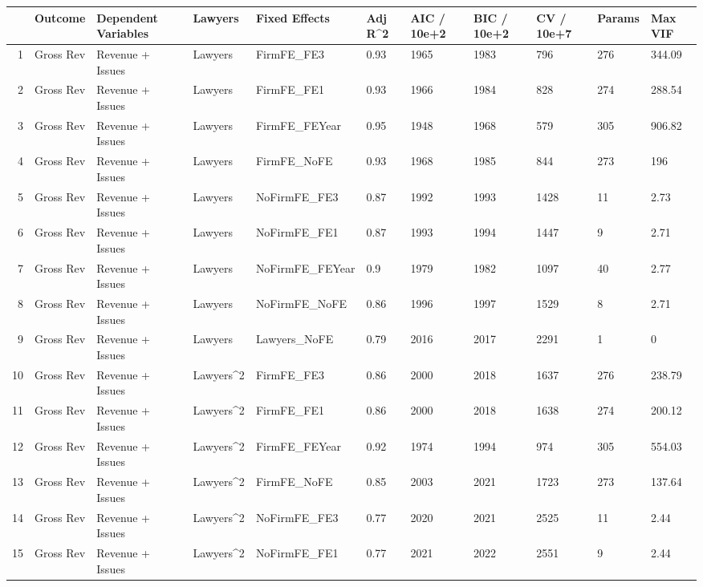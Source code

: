 \begin{table}[ht]
\centering
\begin{tabular}{rllllllllll}
  \hline
 & Outcome & Dependent Variables & Lawyers & Fixed Effects & Adj R^2 & AIC / 10e+2 & BIC / 10e+2 & CV / 10e+7 & Params & Max VIF \\ 
  \hline
1 & Gross Rev & Revenue + Issues & Lawyers & FirmFE\_FE3 & 0.93 & 1965 & 1983 & 796 & 276 & 344.09 \\ 
  2 & Gross Rev & Revenue + Issues & Lawyers & FirmFE\_FE1 & 0.93 & 1966 & 1984 & 828 & 274 & 288.54 \\ 
  3 & Gross Rev & Revenue + Issues & Lawyers & FirmFE\_FEYear & 0.95 & 1948 & 1968 & 579 & 305 & 906.82 \\ 
  4 & Gross Rev & Revenue + Issues & Lawyers & FirmFE\_NoFE & 0.93 & 1968 & 1985 & 844 & 273 & 196 \\ 
  5 & Gross Rev & Revenue + Issues & Lawyers & NoFirmFE\_FE3 & 0.87 & 1992 & 1993 & 1428 & 11 & 2.73 \\ 
  6 & Gross Rev & Revenue + Issues & Lawyers & NoFirmFE\_FE1 & 0.87 & 1993 & 1994 & 1447 & 9 & 2.71 \\ 
  7 & Gross Rev & Revenue + Issues & Lawyers & NoFirmFE\_FEYear & 0.9 & 1979 & 1982 & 1097 & 40 & 2.77 \\ 
  8 & Gross Rev & Revenue + Issues & Lawyers & NoFirmFE\_NoFE & 0.86 & 1996 & 1997 & 1529 & 8 & 2.71 \\ 
  9 & Gross Rev & Revenue + Issues & Lawyers & Lawyers\_NoFE & 0.79 & 2016 & 2017 & 2291 & 1 & 0 \\ 
  10 & Gross Rev & Revenue + Issues & Lawyers^2 & FirmFE\_FE3 & 0.86 & 2000 & 2018 & 1637 & 276 & 238.79 \\ 
  11 & Gross Rev & Revenue + Issues & Lawyers^2 & FirmFE\_FE1 & 0.86 & 2000 & 2018 & 1638 & 274 & 200.12 \\ 
  12 & Gross Rev & Revenue + Issues & Lawyers^2 & FirmFE\_FEYear & 0.92 & 1974 & 1994 & 974 & 305 & 554.03 \\ 
  13 & Gross Rev & Revenue + Issues & Lawyers^2 & FirmFE\_NoFE & 0.85 & 2003 & 2021 & 1723 & 273 & 137.64 \\ 
  14 & Gross Rev & Revenue + Issues & Lawyers^2 & NoFirmFE\_FE3 & 0.77 & 2020 & 2021 & 2525 & 11 & 2.44 \\ 
  15 & Gross Rev & Revenue + Issues & Lawyers^2 & NoFirmFE\_FE1 & 0.77 & 2021 & 2022 & 2551 & 9 & 2.44 \\ 

\end{tabular}
\end{table}
